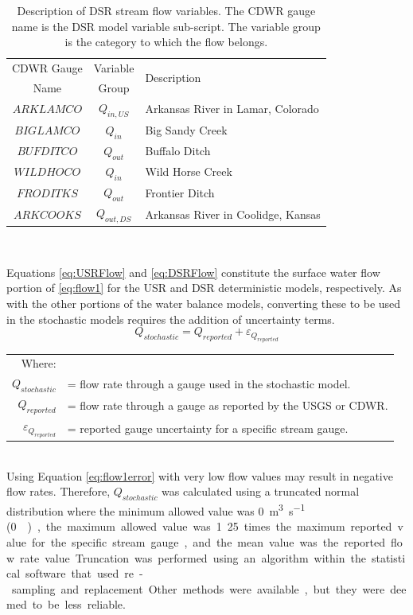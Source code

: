 \begin{linenumbers}
\begin{table}[htbp]
	\centering
	\caption[Description of DSR stream flow variables.]{Description of DSR stream flow variables.  The CDWR gauge name is the DSR model variable sub-script.  The variable group is the category to which the flow belongs.}
	\label{tab:DSRFlow}
	\begin{tabular}{c c p{3.5in}}
		\toprule
		CDWR Gauge & Variable & \multirow{2}{*}{Description}\\
		Name				& Group & \\
		\toprule
		$ ARKLAMCO $ & $ Q_{in,US} $ & Arkansas River in Lamar, Colorado\\ 
		$ BIGLAMCO $ & $ Q_{in} $ & Big Sandy Creek \\
		$ BUFDITCO $ & $ Q_{out} $ & Buffalo Ditch\\
		$ WILDHOCO $ & $ Q_{in} $ & Wild Horse Creek\\
		$ FRODITKS $ & $ Q_{out} $ & Frontier Ditch\\
		$ ARKCOOKS $ & $ Q_{out,DS} $ & Arkansas River in Coolidge, Kansas\\
		\bottomrule
	\end{tabular}\\
\end{table}

Equations \ref{eq:USRFlow} and \ref{eq:DSRFlow} constitute the surface water flow portion of \ref{eq:flow1} for the USR and DSR deterministic models, respectively.  As with the other portions of the water balance models, converting these to be used in the stochastic models requires the addition of uncertainty terms.
\begin{equation}
	\label{eq:flow1error}
	Q_{stochastic} = Q_{reported} + \varepsilon_{Q_{reported}}
\end{equation}
\begin{tabular}{r L{5.5in}}
	Where:\\
	$ Q_{stochastic} $& = flow rate through a gauge used in the stochastic model.\\
	$ Q_{reported}  $ & = flow rate through a gauge as reported by the USGS or CDWR.\\
	$ \varepsilon_{Q_{reported}} $ &= reported gauge uncertainty for a specific stream gauge.\\
\end{tabular}\\

Using Equation \ref{eq:flow1error} with very low flow values may result in negative flow rates.  Therefore, $Q_{stochastic}$ was calculated using a truncated normal distribution where the minimum allowed value was \SI{0}{\cubic\meter\per\second} (\SI{0}{\cubic\foot\per\second}), the maximum allowed value was 1.25 times the maximum reported value for the specific stream gauge, and the mean value was the reported flow rate value.  Truncation was performed using an algorithm within the statistical software that used re-sampling and replacement.  Other methods were available, but they were deemed to be less reliable.


\end{linenumbers}
